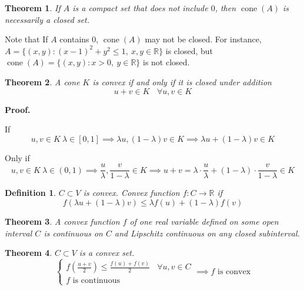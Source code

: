 \documentclass[aps,pra,onecolumn,notitlepage,superscriptaddress]{revtex4-1}
\newcommand{\R}{\mathbb{R}}
\newcommand{\op}[1]{\operatorname{#1}}
\newtheorem{theo}{Theorem}
\newtheorem{defi}{Definition}
\def\Proof{{\bf Proof.~}}
\begin{document}
    \begin{theo}
        If $A$ is a compact set that does not include $0$, then $\op{cone}(A)$ is necessarily a closed set.
    \end{theo}

    Note that If $A$ contains $0$, $\op{cone}(A)$ may not be closed. For instance, $A = \{(x,y) : (x-1)^2+y^2 \leq 1, \ x,y\in \R \}$ is closed, but $\op{cone}(A) = \{ (x,y) : x > 0, \ y \in \R \}$ is not closed.

    \begin{theo}
        A cone $K$ is convex if and only if it is closed under addition
        \begin{equation}
            u+v \in K \ \ \ \ \forall u,v \in K
        \end{equation}
    \end{theo}
    \Proof {
        If
        \begin{equation}
            u,v \in K \ \lambda \in [0,1] \implies \lambda u, (1-\lambda) v \in K \implies \lambda u + (1-\lambda) v \in K
        \end{equation}
        
        Only if
        \begin{equation}
            u,v \in K \ \lambda \in (0,1) \implies \frac{u}{\lambda}, \frac{v}{1-\lambda} \in K \implies u+v = \lambda \cdot \frac{u}{\lambda} + (1-\lambda) \cdot \frac{v}{1-\lambda} \in K
        \end{equation}

    }

    \begin{defi}
        $C \subset V$ is convex. Convex function $f: C \to \R$ if
        \begin{equation}
            f(\lambda u + (1-\lambda) v) \leq \lambda f(u) + (1-\lambda) f(v)
        \end{equation}
    \end{defi}

    \begin{theo}
        A convex function $f$ of one real variable defined on some open interval $C$ is continuous on $C$ and Lipschitz continuous on any closed subinterval. 
    \end{theo}

    \begin{theo}
        $C \subset V$ is a convex set.
        \begin{equation}
            \begin{cases}
                f(\frac{u+v}{2}) \leq \frac{f(u)+f(v)}{2} \ \ \ \ \forall u, v \in C \\
                \text{$f$ is continuous}
            \end{cases}
            \implies \text{$f$ is convex}
        \end{equation}
    \end{theo}
\end{document}
